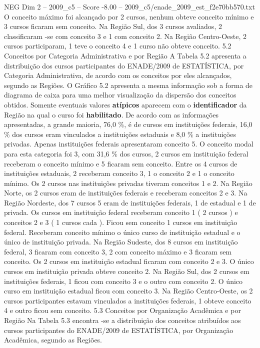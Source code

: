 \begin{textsample}{NEG Dim 2 – 2009\_c5 – Score -8.00 – 2009\_c5/enade\_2009\_est\_f2e70bb570.txt}
O conceito máximo foi alcançado por 2 cursos, nenhum obteve conceito mínimo e 3 cursos ficaram sem conceito.
Na Região Sul, dos 3 cursos avaliados, 2 classificaram -se com conceito 3 e 1 com conceito 2.
Na Região Centro-Oeste, 2 cursos participaram, 1 teve o conceito 4 e 1 curso não obteve conceito. 5.2 Conceitos por Categoria Administrativa e por Região A Tabela 5.2 apresenta a distribuição dos cursos participantes do ENADE/2009 de ESTATÍSTICA, por Categoria Administrativa, de acordo com os conceitos por eles alcançados, segundo as Regiões.
O Gráfico 5.2 apresenta a mesma informação sob a forma de diagrama de caixa para uma melhor visualização da dispersão dos conceitos obtidos.
Somente eventuais valores \textbf{atípicos} aparecem com o \textbf{identificador} da Região na qual o curso foi \textbf{habilitado}.
De acordo com as informações apresentadas, a grande maioria, 76,0 \%, é de cursos em instituições federais, 16,0 \% dos cursos eram vinculados a instituições estaduais e 8,0 \% a instituições privadas.
Apenas instituições federais apresentaram conceito 5.
O conceito modal para esta categoria foi 3, com 31,6 \% dos cursos, 2 cursos em instituição federal receberam o conceito mínimo e 5 ficaram sem conceito.
Entre os 4 cursos de instituições estaduais, 2 receberam conceito 3, 1 o conceito 2 e 1 o conceito mínimo.
Os 2 cursos nas instituições privadas tiveram conceitos 1 e 2.
Na Região Norte, os 2 cursos eram de instituições federais e receberam conceitos 2 e 3.
Na Região Nordeste, dos 7 cursos 5 eram de instituições federais, 1 de estadual e 1 de privada.
Os cursos em instituição federal receberam conceito 1 ( 2 cursos ) e conceitos 2 e 3 ( 1 cursos cada ).
Ficou sem conceito 1 cursos em instituição federal.
Receberam conceito mínimo o único curso de instituição estadual e o único de instituição privada.
Na Região Sudeste, dos 8 cursos em instituição federal, 3 ficaram com conceito 3, 2 com conceito máximo e 3 ficaram sem conceito.
Os 2 cursos em instituição estadual ficaram com conceito 2 e 3.
O único cursos em instituição privada obteve conceito 2.
Na Região Sul, dos 2 cursos em instituições federais, 1 ficou com conceito 3 e o outro com conceito 2.
O único curso em instituição estadual ficou com conceito 3.
Na Região Centro-Oeste, os 2 cursos participantes estavam vinculados a instituições federais, 1 obteve conceito 4 e outro ficou sem conceito. 5.3 Conceitos por Organização Acadêmica e por Região Na Tabela 5.3 encontra -se a distribuição dos conceitos atribuídos aos cursos participantes do ENADE/2009 de ESTATÍSTICA, por Organização Acadêmica, segundo as Regiões.

\end{textsample}
